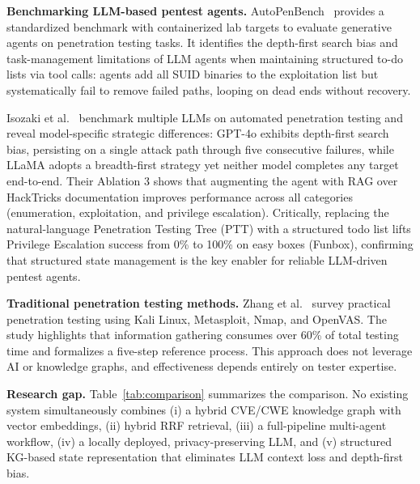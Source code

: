 \documentclass[conference]{IEEEtran}
\begin{document}
\textbf{Benchmarking LLM-based pentest agents.}
AutoPenBench~\cite{autopenbench2024} provides a standardized benchmark with
containerized lab targets to evaluate generative agents on penetration testing
tasks.
It identifies the depth-first search bias and task-management limitations of
LLM agents when maintaining structured to-do lists via tool calls: agents add
all SUID binaries to the exploitation list but systematically fail to remove
failed paths, looping on dead ends without recovery.

Isozaki et al.~\cite{llmbench2024} benchmark multiple LLMs on automated
penetration testing and reveal model-specific strategic differences: GPT-4o
exhibits depth-first search bias, persisting on a single attack path through
five consecutive failures, while LLaMA adopts a breadth-first strategy yet
neither model completes any target end-to-end.
Their Ablation 3 shows that augmenting the agent with RAG over HackTricks
documentation improves performance across all categories (enumeration,
exploitation, and privilege escalation).
Critically, replacing the natural-language Penetration Testing Tree (PTT) with
a structured todo list lifts Privilege Escalation success from 0\% to 100\% on
easy boxes (Funbox), confirming that structured state management is the key
enabler for reliable LLM-driven pentest agents.

\textbf{Traditional penetration testing methods.}
Zhang et al.~\cite{zhang2026pentest} survey practical penetration testing using
Kali Linux, Metasploit, Nmap, and OpenVAS.
The study highlights that information gathering consumes over 60\% of total
testing time and formalizes a five-step reference process.
This approach does not leverage AI or knowledge graphs, and effectiveness
depends entirely on tester expertise.

\textbf{Research gap.}
Table~\ref{tab:comparison} summarizes the comparison.
No existing system simultaneously combines (i) a hybrid CVE/CWE knowledge graph
with vector embeddings, (ii) hybrid RRF retrieval, (iii) a full-pipeline
multi-agent workflow, (iv) a locally deployed, privacy-preserving LLM, and
(v) structured KG-based state representation that eliminates LLM context loss
and depth-first bias.
\end{document}
